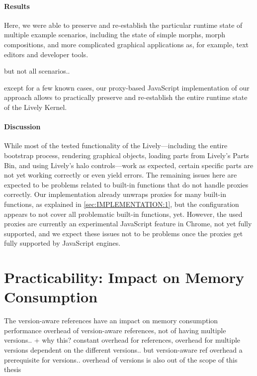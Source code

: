 \paragraph{Results}
Here, we were able to preserve and re-establish the particular runtime state of multiple example scenarios, including the state of simple morphs, morph compositions, and more complicated graphical applications as, for example, text editors and developer tools.

but not all scenarios..

except for a few known cases, our proxy-based JavaScript implementation of our approach allows to practically preserve and re-establish the entire runtime state of the Lively Kernel.

\paragraph{Discussion}
While most of the tested functionality of the Lively---including the entire bootstrap process, rendering graphical objects, loading parts from Lively's Parts Bin, and using Lively's halo controls---work as expected, certain specific parts are not yet working correctly or even yield errors.
The remaining issues here are expected to be problems related to built-in functions that do not handle proxies correctly.
Our implementation already unwraps proxies for many built-in functions, as explained in \ref{sec:IMPLEMENTATION:1}, but the configuration appears to not cover all problematic built-in functions, yet.
However, the used proxies are currently an experimental JavaScript feature in Chrome, not yet fully supported, and we expect these issues not to be problems once the proxies get fully supported by JavaScript engines.


\section{Practicability: Impact on Memory Consumption} \label{sec:DISCUSSION:2}

The version-aware references have an impact on memory consumption
performance overhead of version-aware references, not of having multiple versions.. + why this? constant overhead for references, overhead for multiple versions dependent on the different versions.. but version-aware ref overhead a prerequisite for versions.. overhead of versions is also out of the scope of this thesis


